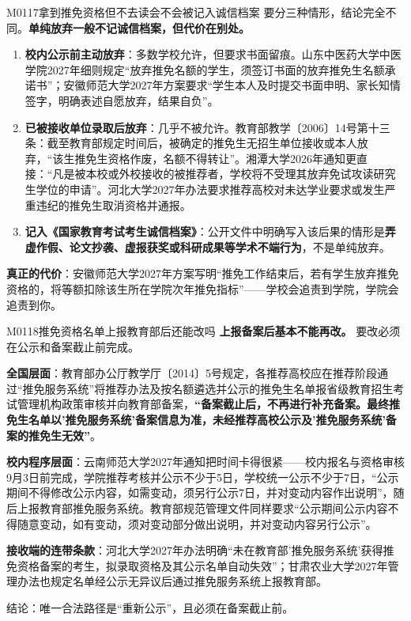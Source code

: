 \begin{qa}{M0117}{拿到推免资格但不去读会不会被记入诚信档案}
要分三种情形，结论完全不同。\textbf{单纯放弃一般不记诚信档案，但代价在别处。}

\begin{enumerate}
  \item \textbf{校内公示前主动放弃}：多数学校允许，但要求书面留痕。山东中医药大学中医学院2027年细则规定“放弃推免名额的学生，须签订书面的放弃推免生名额承诺书”；安徽师范大学2027年方案要求“学生本人及时提交书面申明、家长知情签字，明确表述自愿放弃，结果自负”。
  \item \textbf{已被接收单位录取后放弃}：几乎不被允许。教育部教学〔2006〕14号第十三条：截至教育部规定时间后，被确定的推免生无招生单位接收或本人放弃，“该生推免生资格作废，名额不得转让”。湘潭大学2026年通知更直接：“凡是被本校或外校接收的被推荐者，学校将不受理其放弃免试攻读研究生学位的申请”。河北大学2027年办法要求推荐高校对未达学业要求或发生严重违纪的推免生取消资格并通报。
  \item \textbf{记入《国家教育考试考生诚信档案》}：公开文件中明确写入该后果的情形是\textbf{弄虚作假、论文抄袭、虚报获奖或科研成果等学术不端行为}，不是单纯放弃。
\end{enumerate}

\textbf{真正的代价}：安徽师范大学2027年方案写明“推免工作结束后，若有学生放弃推免资格的，将等额扣除该生所在学院次年推免指标”——学校会追责到学院，学院会追责到你。
\end{qa}

\begin{qa}{M0118}{推免资格名单上报教育部后还能改吗}
\textbf{上报备案后基本不能再改。} 要改必须在公示和备案截止前完成。

\textbf{全国层面}：教育部办公厅教学厅〔2014〕5号规定，各推荐高校应在推荐阶段通过“推免服务系统”将推荐办法及按名额遴选并公示的推免生名单报省级教育招生考试管理机构政策审核并向教育部备案，\textbf{“备案截止后，不再进行补充备案。最终推免生名单以'推免服务系统'备案信息为准，未经推荐高校公示及'推免服务系统'备案的推免生无效”}。

\textbf{校内程序层面}：云南师范大学2027年通知把时间卡得很紧——校内报名与资格审核9月3日前完成，学院推荐考核并公示不少于5日，学校统一公示不少于7日，“公示期间不得修改公示内容，如需变动，须另行公示7日，并对变动内容作出说明”，随后上报教育部推免服务系统。教育部规范管理文件同样要求“公示期间公示内容不得随意变动，如有变动，须对变动部分做出说明，并对变动内容另行公示”。

\textbf{接收端的连带条款}：河北大学2027年办法明确“未在教育部'推免服务系统'获得推免资格备案的考生，拟录取资格及其公示名单自动失效”；甘肃农业大学2027年管理办法也规定名单经公示无异议后通过推免服务系统上报教育部。

结论：唯一合法路径是“重新公示”，且必须在备案截止前。
\end{qa}

